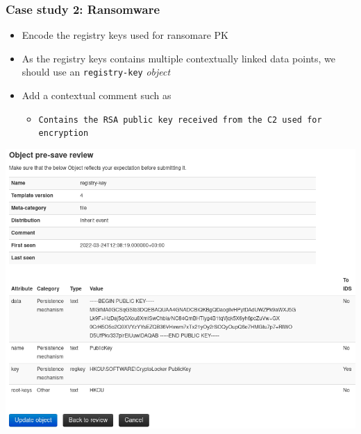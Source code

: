\begin{frame}
    \frametitle{Case study 2: Ransomware}
    \begin{itemize}
        \item Encode the registry keys used for ransomare PK
        \item As the registry keys contains multiple contextually linked data points, we should use an \texttt{registry-key} \textit{object}
        \item Add a contextual comment such as
        \begin{itemize}
            \item \texttt{Contains the RSA public key received from the C2 used for encryption}
        \end{itemize}
    \end{itemize}
    \begin{center}
        \includegraphics[width=0.55\linewidth]{pictures/case2/object-registry-pb.png}
    \end{center}
\end{frame}

